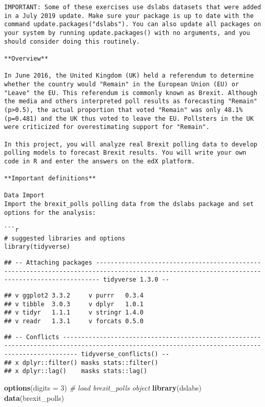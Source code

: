 \documentclass[
]{article}
\newenvironment{Shaded}{\begin{snugshade}}{\end{snugshade}}
\newcommand{\CommentTok}[1]{\textcolor[rgb]{0.56,0.35,0.01}{\textit{#1}}}
\newcommand{\DataTypeTok}[1]{\textcolor[rgb]{0.13,0.29,0.53}{#1}}
\newcommand{\DecValTok}[1]{\textcolor[rgb]{0.00,0.00,0.81}{#1}}
\newcommand{\KeywordTok}[1]{\textcolor[rgb]{0.13,0.29,0.53}{\textbf{#1}}}
\newcommand{\NormalTok}[1]{#1}
\begin{document}
\begin{verbatim}
IMPORTANT: Some of these exercises use dslabs datasets that were added in a July 2019 update. Make sure your package is up to date with the command update.packages("dslabs"). You can also update all packages on your system by running update.packages() with no arguments, and you should consider doing this routinely.

**Overview**

In June 2016, the United Kingdom (UK) held a referendum to determine whether the country would "Remain" in the European Union (EU) or "Leave" the EU. This referendum is commonly known as Brexit. Although the media and others interpreted poll results as forecasting "Remain" (p>0.5), the actual proportion that voted "Remain" was only 48.1% (p=0.481) and the UK thus voted to leave the EU. Pollsters in the UK were criticized for overestimating support for "Remain". 

In this project, you will analyze real Brexit polling data to develop polling models to forecast Brexit results. You will write your own code in R and enter the answers on the edX platform.

**Important definitions**

Data Import  
Import the brexit_polls polling data from the dslabs package and set options for the analysis:

```r
# suggested libraries and options
library(tidyverse)
\end{verbatim}

\begin{verbatim}
## -- Attaching packages --------------------------------------------------------------------------------------------------------------------------------------------- tidyverse 1.3.0 --
\end{verbatim}

\begin{verbatim}
## v ggplot2 3.3.2     v purrr   0.3.4
## v tibble  3.0.3     v dplyr   1.0.1
## v tidyr   1.1.1     v stringr 1.4.0
## v readr   1.3.1     v forcats 0.5.0
\end{verbatim}

\begin{verbatim}
## -- Conflicts ------------------------------------------------------------------------------------------------------------------------------------------------ tidyverse_conflicts() --
## x dplyr::filter() masks stats::filter()
## x dplyr::lag()    masks stats::lag()
\end{verbatim}

\begin{Shaded}
\begin{Highlighting}[]
\KeywordTok{options}\NormalTok{(}\DataTypeTok{digits =} \DecValTok{3}\NormalTok{)}
\CommentTok{\# load brexit\_polls object}
\KeywordTok{library}\NormalTok{(dslabs)}
\KeywordTok{data}\NormalTok{(brexit\_polls)}
\end{Highlighting}
\end{Shaded}
\end{document}
